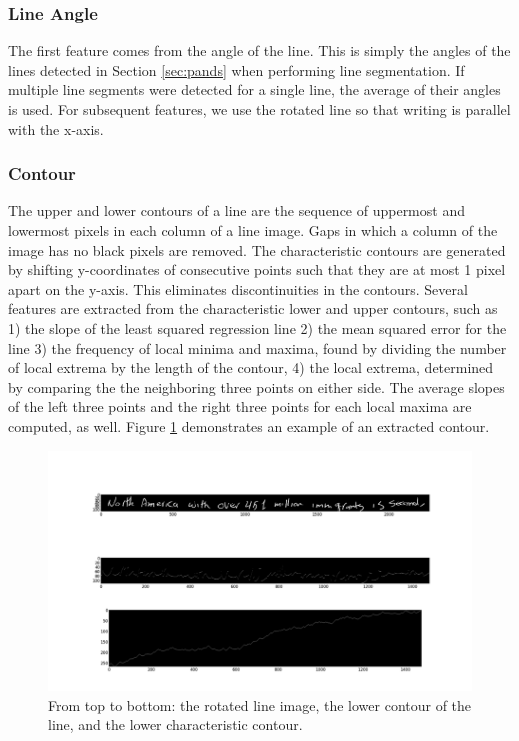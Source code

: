 \documentclass[paper=a4, fontsize=11pt]{scrartcl} %
\numberwithin{equation}{section} %
\numberwithin{figure}{section} %
\numberwithin{table}{section} %
\begin{document}
\subsubsection{Line Angle}
The first feature comes from the angle of the line. This is simply the
angles of the lines detected in Section \ref{sec:pands} when
performing line segmentation. If multiple line segments were detected
for a single line, the average of their angles is used. For subsequent
features, we use the rotated line so that writing is parallel with the
x-axis.

\subsubsection{Contour}
The upper and lower contours of a line are the sequence of uppermost
and lowermost pixels in each column of a line image. Gaps in which a column
of the image has no black pixels are removed. The characteristic
contours are generated by shifting y-coordinates of consecutive
points such that they are at most 1 pixel apart on the y-axis. This eliminates
discontinuities in the contours. Several
features are extracted from the characteristic lower and upper
contours, such as 1) the slope of the least squared regression line 2)
the mean squared error for the line 3) the frequency of local minima
and maxima, found by dividing the number of local extrema by the
length of the contour, 4) the local extrema, determined by comparing
the the neighboring three points on either side. The average slopes of
the left three points and the right three points for each local maxima
are computed, as well. Figure \ref{fig:contourimage} demonstrates an
example of an extracted contour.

\begin{figure}
  \centering \includegraphics{contourimage.png}
  \caption{From top to bottom: the rotated line image, the lower
    contour of the line, and the lower characteristic contour.}
  \label{fig:contourimage}
\end{figure}
\end{document}

